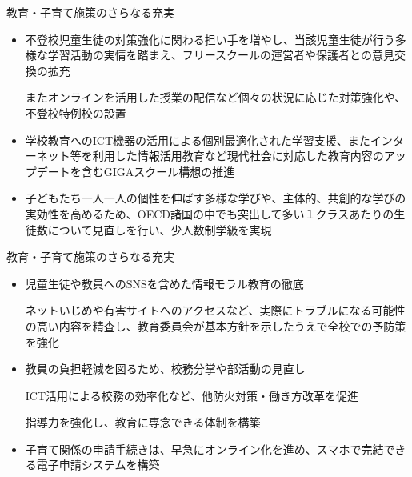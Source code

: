 \documentclass[dvipdfmx]{beamer}
\begin{document}
    \begin{frame}{教育・子育て施策のさらなる充実}{}
        \begin{small}
            \begin{itemize}
                \setlength{\parsep}{.5mm}
                \setlength{\itemsep}{2mm}
                \item 不登校児童生徒の対策強化に関わる担い手を増やし、当該児童生徒が行う多様な学習活動の実情を踏まえ、フリースクールの運営者や保護者との意見交換の拡充\par
                またオンラインを活用した授業の配信など個々の状況に応じた対策強化や、不登校特例校の設置
                \item 学校教育へのICT機器の活用による個別最適化された学習支援、またインターネット等を利用した情報活用教育など現代社会に対応した教育内容のアップデートを含むGIGAスクール構想の推進
                \item 子どもたち一人一人の個性を伸ばす多様な学びや、主体的、共創的な学びの実効性を高めるため、OECD諸国の中でも突出して多い１クラスあたりの生徒数について見直しを行い、少人数制学級を実現
            \end{itemize}
        \end{small}
    \end{frame}

    \begin{frame}{教育・子育て施策のさらなる充実}{}
        \begin{small}
            \begin{itemize}
                \setlength{\parsep}{.5mm}
                \setlength{\itemsep}{2mm}
                \item 児童生徒や教員へのSNSを含めた情報モラル教育の徹底\par
                ネットいじめや有害サイトへのアクセスなど、実際にトラブルになる可能性の高い内容を精査し、教育委員会が基本方針を示したうえで全校での予防策を強化
                \item 教員の負担軽減を図るため、校務分掌や部活動の見直し\par
                ICT活用による校務の効率化など、他防火対策・働き方改革を促進\par
                指導力を強化し、教育に専念できる体制を構築
                \item 子育て関係の申請手続きは、早急にオンライン化を進め、スマホで完結できる電子申請システムを構築
            \end{itemize}
        \end{small}
    \end{frame}
\end{document}
